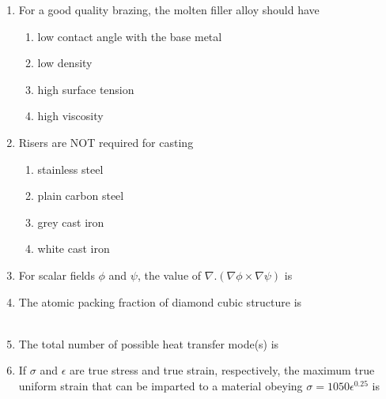 \documentclass[journal]{IEEEtran}
\theoremstyle{remark}
\begin{document}
\begin{enumerate}
\item For a good quality brazing, the molten filler alloy should have \hfill{}
\begin{multicols}{2}
\begin{enumerate}
\item low contact angle with the base metal
\item low density 
\item high surface tension 
\item high viscosity 
\end{enumerate}
\end{multicols}

\item Risers are NOT required for casting 
\hfill{}
\begin{multicols}{2}
\begin{enumerate}
\item stainless steel 
\item plain carbon steel 
\item grey cast iron
\item white cast iron 
\end{enumerate}
\end{multicols}

\item For scalar fields $\phi$ and $\psi$, the value of $\nabla.(\nabla\phi\times\nabla\psi)$ is\underline {\hspace{2cm}}\hfill{}

\item The atomic packing fraction of diamond cubic structure is\underline {\hspace{2cm}}\\
\hfill{}\\

\item The total number of possible heat transfer mode(s) is \underline {\hspace{2cm}}                \hfill{}\\

\item If $\sigma$ and $\epsilon$ are true stress and true strain, respectively, the maximum true uniform strain that can be
imparted to a material obeying $\sigma=1050\epsilon^{0.25}$ is \underline {\hspace{2cm}} \hfill{}


\end{enumerate}
\end{document}
